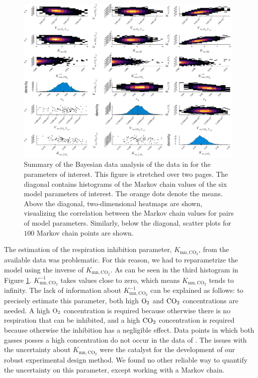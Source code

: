 \begin{figure}[t!]
	\centering
	\includegraphics[width=0.99\textwidth]{figure/paper 2/test2.pdf}
	\caption{Summary of the Bayesian data analysis of the data in \textcite{ho} for the parameters of interest. {\color{red}This figure is stretched over two pages. The diagonal contains histograms of the Markov chain values of the six model parameters of interest. The orange dots denote the means. Above the diagonal, two-dimensional heatmaps are shown, visualizing the correlation between the Markov chain values for pairs of model parameters. Similarly, below the diagonal, scatter plots for $100$ Markov chain points are shown.}}
	\label{figprior}
\end{figure}
The estimation of the respiration inhibition parameter, $K_{\text{mn},\text{CO}_2}$, from the available data was problematic. For this reason, we had to reparametrize the model using the inverse of $K_{\text{mn},\text{CO}_2}$. As can be seen in the third histogram in Figure \ref{figprior}. $K_{\text{mn},\text{CO}_2}^{-1}$ takes values close to zero, which means $K_{\text{mn},\text{CO}_2}$ tends to infinity. The lack of information about $K_{\text{mn},\text{CO}_2}^{-1}$ can be explained as follows: to precisely estimate this parameter, both high $\text{O}_2$ and $\text{CO}_2$ concentrations are needed. A high $\text{O}_2$ concentration is required because otherwise there is no respiration that can be inhibited, and a high $\text{CO}_2$ concentration is required because otherwise the inhibition has a negligible effect. Data points in which both gasses posses a high concentration do not occur in the data of \textcite{ho}. {\color{red}The issues with the uncertainty about $K_{\text{mn},\text{CO}_2}$ were the catalyst for the development of our robust experimental design method. We found no other reliable way to quantify the uncertainty on this parameter, except working with a Markov chain.}
